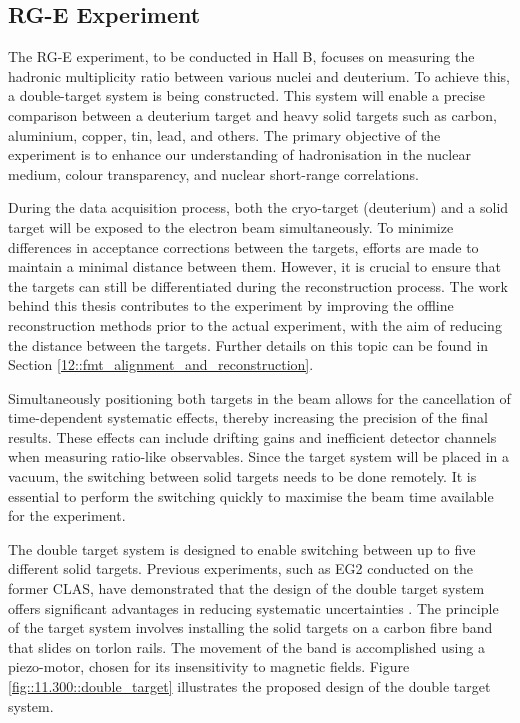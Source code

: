 \subsection{RG-E Experiment}
\label{11.300::rge_experiment}
    The RG-E experiment, to be conducted in Hall B, focuses on measuring the hadronic multiplicity ratio between various nuclei and deuterium.
    To achieve this, a double-target system is being constructed.
    This system will enable a precise comparison between a deuterium target and heavy solid targets such as carbon, aluminium, copper, tin, lead, and others.
    The primary objective of the experiment is to enhance our understanding of hadronisation in the nuclear medium, colour transparency, and nuclear short-range correlations.

    During the data acquisition process, both the cryo-target (deuterium) and a solid target will be exposed to the electron beam simultaneously.
    To minimize differences in acceptance corrections between the targets, efforts are made to maintain a minimal distance between them.
    However, it is crucial to ensure that the targets can still be differentiated during the reconstruction process.
    The work behind this thesis contributes to the experiment by improving the offline reconstruction methods prior to the actual experiment, with the aim of reducing the distance between the targets.
    Further details on this topic can be found in Section \ref{12::fmt_alignment_and_reconstruction}.

    Simultaneously positioning both targets in the beam allows for the cancellation of time-dependent systematic effects, thereby increasing the precision of the final results.
    These effects can include drifting gains and inefficient detector channels when measuring ratio-like observables.
    Since the target system will be placed in a vacuum, the switching between solid targets needs to be done remotely.
    It is essential to perform the switching quickly to maximise the beam time available for the experiment.

    The double target system is designed to enable switching between up to five different solid targets.
    Previous experiments, such as EG2 conducted on the former CLAS, have demonstrated that the design of the double target system offers significant advantages in reducing systematic uncertainties \cite{hakobyan2008}.
    The principle of the target system involves installing the solid targets on a carbon fibre band that slides on torlon rails.
    The movement of the band is accomplished using a piezo-motor, chosen for its insensitivity to magnetic fields.
    Figure \ref{fig::11.300::double_target} illustrates the proposed design of the double target system.

